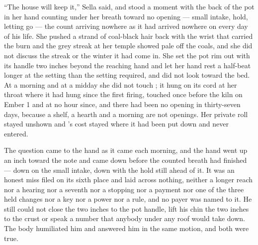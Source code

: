 “The house will keep it,” Sella said, and stood a moment with the back of the pot in her hand counting under her breath toward no opening --- small intake, hold, letting go --- the count arriving nowhere as it had arrived nowhere on every day of his life. She pushed a strand of coal-black hair back with the wrist that carried the burn and the grey streak at her temple showed pale off the coals, and she did not discuss the streak or the winter it had come in. She set the pot rim out with its handle two inches beyond the reaching hand and let her hand rest a half-beat longer at the setting than the setting required, and did not look toward the bed. At a morning and at a midday she did not touch ; it hung on its cord at her throat where it had hung since the first firing, touched once before the kiln on Ember 1 and at no hour since, and there had been no opening in thirty-seven days, because a shelf, a hearth and a morning are not openings. Her private roll stayed unshown and 's cost stayed where it had been put down and never entered.

The question came to the hand as it came each morning, and the hand went up an inch toward the note and came down before the counted breath had finished --- down on the small intake, down with the hold still ahead of it. It was an honest miss filed on its sixth place and laid across nothing, neither a longer reach nor a hearing nor a seventh nor a stopping nor a payment nor one of the three held changes nor a key nor a power nor a rule, and no payer was named to it. He still could not close the two inches to the pot handle, lift his chin the two inches to the crust or speak a number that anybody under any roof would take down. The body humiliated him and answered him in the same motion, and both were true.

\scenebreak

